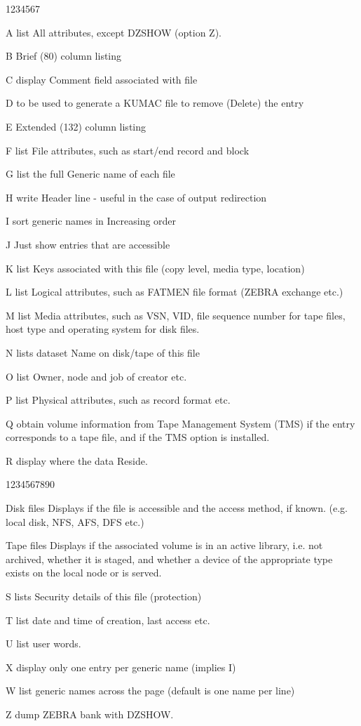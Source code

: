 \begin{DLtt}{1234567}
\item[A]list All attributes, except DZSHOW (option Z).
\item[B]Brief (80) column listing
\item[C]display Comment field associated with file
\item[D]to be used to generate a KUMAC file to remove (Delete) the entry
\item[E]Extended (132) column listing
\item[F]list File attributes, such as start/end record and block
\item[G]list the full Generic name of each file
\item[H]write Header line - useful in the case of output redirection 
\item[I]sort generic names in Increasing order
\item[J]Just show entries that are accessible
\item[K]list Keys associated with this file (copy level, media type, location)
\item[L]list Logical attributes, such as FATMEN file format
(ZEBRA exchange etc.)
\item[M]list Media attributes, such as VSN, VID, file sequence number for tape
files, host type and operating system for disk files.
\item[N]lists dataset Name on disk/tape of this file
\item[O]list Owner, node and job of creator etc.
\item[P]list Physical attributes, such as record format etc.
\item[Q]obtain volume information from Tape Management System (TMS)
if the entry corresponds to a tape file, and if the TMS
option is installed.
\item[R]display where the data Reside. 
\begin{DLtt}{1234567890}
\item[Disk files]Displays if the file is accessible and the access method, if
known. (e.g. local disk, NFS, AFS, DFS etc.)
\item[Tape files]Displays if the associated volume is in an active library,
i.e. not archived, whether it is staged, and whether a device of the appropriate
type exists on the local node or is served.
\end{DLtt}
\item[S]lists Security details of this file (protection)
\item[T]list date and time of creation, last access etc.
\item[U]list user words.
\item[X]display only one entry per generic name (implies I)
\item[W]list generic names across the page (default is one name per line)
\item[Z]dump ZEBRA bank with DZSHOW.
\end{DLtt}

